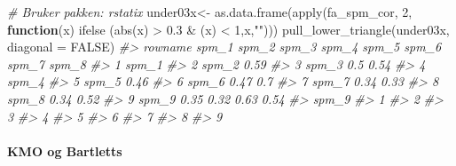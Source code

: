 \documentclass[
]{article}
\newenvironment{Shaded}{\begin{snugshade}}{\end{snugshade}}
\newcommand{\AttributeTok}[1]{\textcolor[rgb]{0.77,0.63,0.00}{#1}}
\newcommand{\CommentTok}[1]{\textcolor[rgb]{0.56,0.35,0.01}{\textit{#1}}}
\newcommand{\ConstantTok}[1]{\textcolor[rgb]{0.00,0.00,0.00}{#1}}
\newcommand{\ControlFlowTok}[1]{\textcolor[rgb]{0.13,0.29,0.53}{\textbf{#1}}}
\newcommand{\DecValTok}[1]{\textcolor[rgb]{0.00,0.00,0.81}{#1}}
\newcommand{\FloatTok}[1]{\textcolor[rgb]{0.00,0.00,0.81}{#1}}
\newcommand{\FunctionTok}[1]{\textcolor[rgb]{0.00,0.00,0.00}{#1}}
\newcommand{\NormalTok}[1]{#1}
\newcommand{\OtherTok}[1]{\textcolor[rgb]{0.56,0.35,0.01}{#1}}
\newcommand{\SpecialCharTok}[1]{\textcolor[rgb]{0.00,0.00,0.00}{#1}}
\newcommand{\StringTok}[1]{\textcolor[rgb]{0.31,0.60,0.02}{#1}}
\begin{document}
\begin{Shaded}
\begin{Highlighting}[]
\CommentTok{\# Bruker pakken: rstatix}
\NormalTok{under03x}\OtherTok{\textless{}{-}} \FunctionTok{as.data.frame}\NormalTok{(}\FunctionTok{apply}\NormalTok{(fa\_spm\_cor, }\DecValTok{2}\NormalTok{, }\ControlFlowTok{function}\NormalTok{(x) }\FunctionTok{ifelse}\NormalTok{ (}\FunctionTok{abs}\NormalTok{(x) }\SpecialCharTok{\textgreater{}} \FloatTok{0.3} \SpecialCharTok{\&}\NormalTok{ (x) }\SpecialCharTok{\textless{}} \DecValTok{1}\NormalTok{,x,}\StringTok{""}\NormalTok{)))}
\FunctionTok{pull\_lower\_triangle}\NormalTok{(under03x, }\AttributeTok{diagonal =} \ConstantTok{FALSE}\NormalTok{)}
\CommentTok{\#\textgreater{}   rowname spm\_1 spm\_2 spm\_3 spm\_4 spm\_5 spm\_6 spm\_7 spm\_8}
\CommentTok{\#\textgreater{} 1   spm\_1                                                }
\CommentTok{\#\textgreater{} 2   spm\_2  0.59                                          }
\CommentTok{\#\textgreater{} 3   spm\_3   0.5  0.54                                    }
\CommentTok{\#\textgreater{} 4   spm\_4                                                }
\CommentTok{\#\textgreater{} 5   spm\_5                    0.46                        }
\CommentTok{\#\textgreater{} 6   spm\_6                    0.47   0.7                  }
\CommentTok{\#\textgreater{} 7   spm\_7  0.34  0.33                                    }
\CommentTok{\#\textgreater{} 8   spm\_8                                0.34  0.52      }
\CommentTok{\#\textgreater{} 9   spm\_9  0.35                          0.32  0.63  0.54}
\CommentTok{\#\textgreater{}   spm\_9}
\CommentTok{\#\textgreater{} 1      }
\CommentTok{\#\textgreater{} 2      }
\CommentTok{\#\textgreater{} 3      }
\CommentTok{\#\textgreater{} 4      }
\CommentTok{\#\textgreater{} 5      }
\CommentTok{\#\textgreater{} 6      }
\CommentTok{\#\textgreater{} 7      }
\CommentTok{\#\textgreater{} 8      }
\CommentTok{\#\textgreater{} 9}
\end{Highlighting}
\end{Shaded}

\hypertarget{kmo-og-bartletts}{%
\paragraph{KMO og Bartletts}\label{kmo-og-bartletts}}
\end{document}
